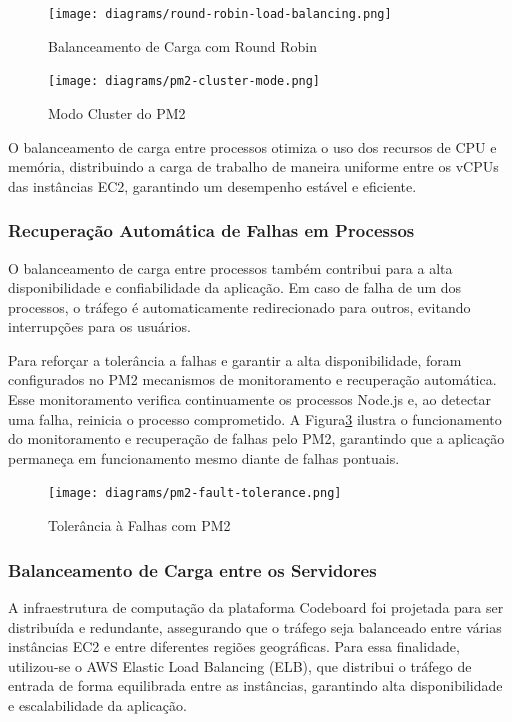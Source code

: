 \begin{figure}[H]
    \centering
    \texttt{[image: diagrams/round-robin-load-balancing.png]}
    \caption{Balanceamento de Carga com Round Robin}
    \label{fig:round-robin-load-balancing}
\end{figure} 

\begin{figure}[H]
    \centering
    \texttt{[image: diagrams/pm2-cluster-mode.png]}
    \caption{Modo Cluster do PM2}
    \label{fig:pm2-cluster-mode}
\end{figure}

O balanceamento de carga entre processos otimiza o uso dos recursos de CPU e memória, distribuindo a carga de trabalho de maneira uniforme entre os vCPUs das instâncias EC2, garantindo um desempenho estável e eficiente.

\subsubsection{Recuperação Automática de Falhas em Processos}

O balanceamento de carga entre processos também contribui para a alta disponibilidade e confiabilidade da aplicação. Em caso de falha de um dos processos, o tráfego é automaticamente redirecionado para outros, evitando interrupções para os usuários.

Para reforçar a tolerância a falhas e garantir a alta disponibilidade, foram configurados no PM2 mecanismos de monitoramento e recuperação automática. Esse monitoramento verifica continuamente os processos Node.js e, ao detectar uma falha, reinicia o processo comprometido. A Figura\ref{fig:pm2-fault-tolerance} ilustra o funcionamento do monitoramento e recuperação de falhas pelo PM2, garantindo que a aplicação permaneça em funcionamento mesmo diante de falhas pontuais.


\begin{figure}[H]
    \centering
    \texttt{[image: diagrams/pm2-fault-tolerance.png]}
    \caption{Tolerância à Falhas com PM2}
    \label{fig:pm2-fault-tolerance}
\end{figure}


\subsubsection{Balanceamento de Carga entre os Servidores}

A infraestrutura de computação da plataforma Codeboard foi projetada para ser distribuída e redundante, assegurando que o tráfego seja balanceado entre várias instâncias EC2 e entre diferentes regiões geográficas. Para essa finalidade, utilizou-se o AWS Elastic Load Balancing (ELB), que distribui o tráfego de entrada de forma equilibrada entre as instâncias, garantindo alta disponibilidade e escalabilidade da aplicação.

